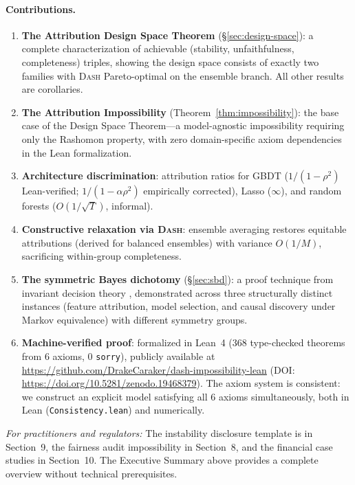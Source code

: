 \documentclass{article}
\newcommand{\DASH}{\textsc{Dash}}
\newcommand{\GBDT}{\textsc{GBDT}}
\begin{document}
\paragraph{Contributions.}
\begin{sloppypar}
\begin{enumerate}
    \item \textbf{The Attribution Design Space Theorem} (\S\ref{sec:design-space}):
    a complete characterization of achievable (stability, unfaithfulness, completeness)
    triples, showing the design space consists of exactly two families with \DASH{}
    Pareto-optimal on the ensemble branch. All other results are corollaries.
    \item \textbf{The Attribution Impossibility} (Theorem~\ref{thm:impossibility}):
    the base case of the Design Space Theorem---a model-agnostic impossibility
    requiring only the Rashomon property, with zero domain-specific axiom dependencies in the Lean
    formalization.
    \item \textbf{Architecture discrimination}: attribution ratios for \GBDT{}
    ($1/(1{-}\rho^2)$ Lean-verified; $1/(1{-}\alpha\rho^2)$ empirically corrected),
    Lasso ($\infty$), and random forests ($O(1/\sqrt{T})$, informal).
    \item \textbf{Constructive relaxation via \DASH{}}: ensemble averaging restores
    equitable attributions (derived for balanced ensembles) with variance $O(1/M)$,
    sacrificing within-group completeness.
    \item \textbf{The symmetric Bayes dichotomy} (\S\ref{sec:sbd}): a proof technique
    from invariant decision theory \citep{lehmann2005testing}, demonstrated across three
    structurally distinct instances (feature attribution, model selection, and causal
    discovery under Markov equivalence) with different symmetry groups.
    \item \textbf{Machine-verified proof}: formalized in Lean~4 (368 type-checked theorems from 6 axioms, 0 \texttt{sorry}), publicly available at \url{https://github.com/DrakeCaraker/dash-impossibility-lean} (DOI: \url{https://doi.org/10.5281/zenodo.19468379}). The axiom system is consistent: we construct an explicit model satisfying all 6 axioms simultaneously, both in Lean (\texttt{Consistency.lean}) and numerically.
\end{enumerate}
\end{sloppypar}

\noindent\textit{For practitioners and regulators:} The instability disclosure template is in Section~9, the fairness audit impossibility in Section~8, and the financial case studies in Section~10. The Executive Summary above provides a complete overview without technical prerequisites.
\end{document}
